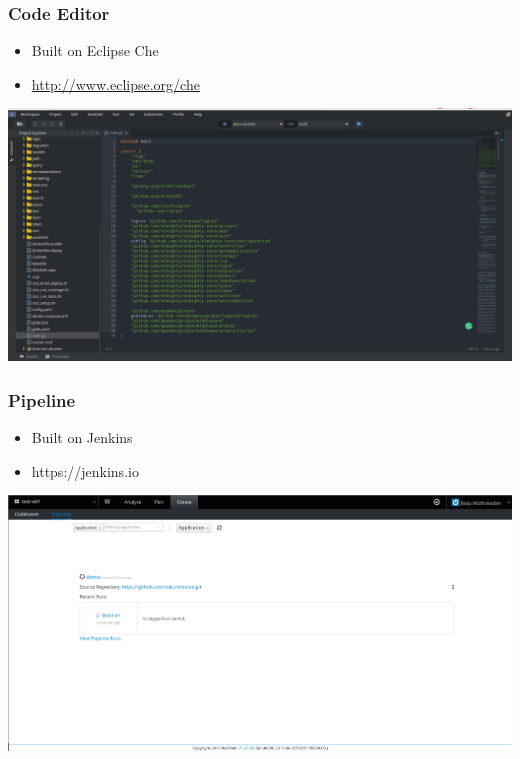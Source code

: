 \documentclass[aspectratio=169]{beamer}
\begin{document}
\begin{frame}
  \frametitle{Code Editor}

  \begin{itemize}
  \item<1-> Built on Eclipse Che
  \item<2-> \url{http://www.eclipse.org/che}
  \end{itemize}

\end{frame}

\begin{frame}
\includegraphics[scale=.2]{images/che.png}
\end{frame}

\begin{frame}
  \frametitle{Pipeline}

  \begin{itemize}
  \item<1-> Built on Jenkins
  \item<2-> https://jenkins.io
  \end{itemize}

\end{frame}

\begin{frame}
\includegraphics[scale=.27]{images/pipeline.png}
\end{frame}
\end{document}
